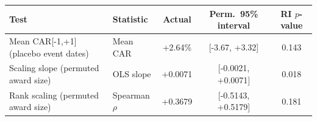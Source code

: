 \begin{tabular}{llccc}
\toprule
Test & Statistic & Actual & Perm.\ 95\% interval & RI $p$-value \\
\midrule
Mean CAR[-1,+1] (placebo event dates) & Mean CAR & +2.64\% & [-3.67, +3.32] & 0.143 \\
Scaling slope (permuted award size) & OLS slope & +0.0071 & [-0.0021, +0.0071] & 0.018 \\
Rank scaling (permuted award size) & Spearman $\rho$ & +0.3679 & [-0.5143, +0.5179] & 0.181 \\
\bottomrule
\end{tabular}